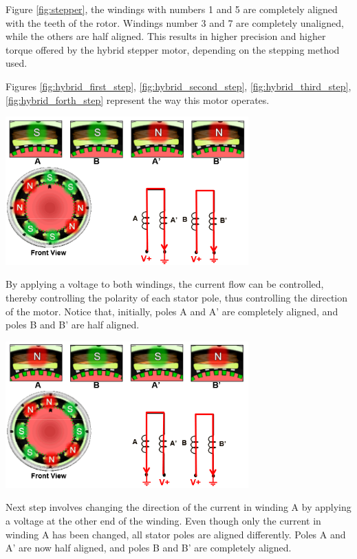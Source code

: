 \newpage
Figure \ref{fig:stepper}, the windings with numbers 1 and 5 are completely aligned with the teeth 
of the rotor. Windings number 3 and 7 are completely unaligned, while the others are half aligned. 
This results in higher precision and higher torque offered by the hybrid stepper motor, depending 
on the stepping method used.

Figures \ref{fig:hybrid_first_step},  \ref{fig:hybrid_second_step}, \ref{fig:hybrid_third_step},
\ref{fig:hybrid_forth_step} 
represent the way this motor operates.

\begin{center}
	\includegraphics[width=0.7\textwidth]{figures/move/motor32}
	 \cite{figures}
	\label{fig:hybrid_first_step}
\end{center}
By applying a voltage to both windings, the current flow can be controlled, thereby controlling the 
polarity of each stator pole, thus controlling the direction of the motor. Notice that, initially, 
poles A and A’ are completely aligned, and poles B and B’ are half aligned. 

\begin{center}
	\includegraphics[width=0.7\textwidth]{figures/move/motor33}
	 \cite{figures}
	\label{fig:hybrid_second_step}
\end{center}

Next step involves changing the direction of the current in winding A by applying a voltage at the 
other end of the winding. Even though only the current in winding A has been changed, all stator 
poles are aligned differently. Poles A and A’ are now half aligned, and poles B and B’ are 
completely aligned.


